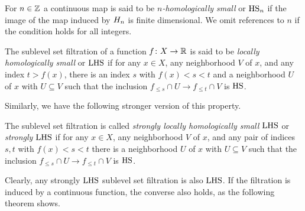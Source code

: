 \begin{defi} \label{defi:local_connectedness}
	For $n \in \mathbb{Z}$ a continuous map is said to be \textit{$n$-homologically small} or $\mathrm{HS}_n$ if the image of the map induced by $H_{n}$ is finite dimensional.
	We omit references to $n$ if the condition holds for all integers.
\end{defi}

\begin{defi} \label{defi:local_connectedness_filtrations}
	The sublevel set filtration of a function $f \colon X \to \mathbb{R}$ is said to be \emph{locally homologically small} or $\mathrm{LHS}$ if for any $x \in X$, any neighborhood $V$ of $x$, and any index $t > f(x)$, there is an index $s$ with  $f(x) < s < t$ and a neighborhood $U$ of $x$ with $U \subseteq V$ such that the inclusion $f_{\leq s} \cap U \to f_{\leq t} \cap V$ is $\mathrm{HS}$.
\end{defi}
Similarly, we have the following stronger version of this property.
\begin{defi}
	The sublevel set filtration is called \emph{strongly locally homologically small $\mathrm{LHS}$} or \emph{strongly $\mathrm{LHS}$} if for any $x \in X$, any neighborhood $V$ of $x$, and any pair of indices $s,t$ with $f(x) < s < t$ there is a neighborhood $U$ of $x$ with $U \subseteq V$ such that the inclusion $f_{\leq s} \cap U \to f_{\leq t} \cap V$ is $\mathrm{HS}$.
\end{defi}

Clearly, any strongly $\mathrm{LHS}$ sublevel set filtration is also $\mathrm{LHS}$.
If the filtration is induced by a continuous function, the converse also holds, as the following theorem shows.


